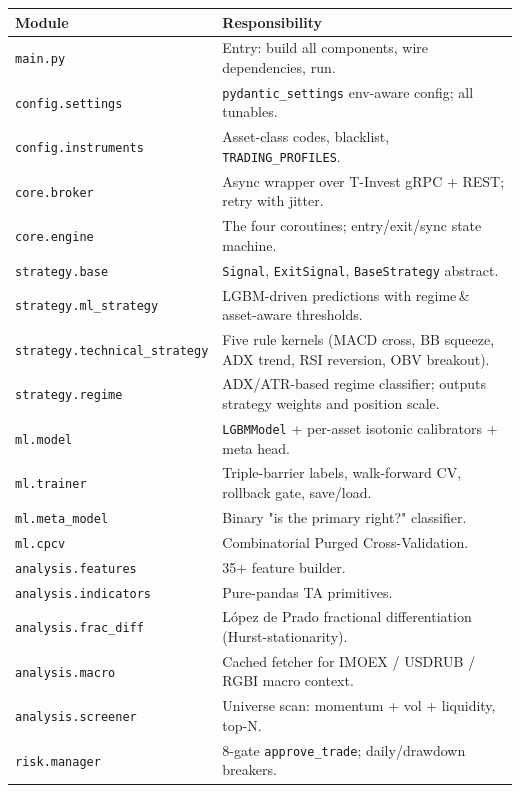 \documentclass[11pt,a4paper]{article}
\begin{document}
\begin{center}
\footnotesize
\begin{tabular}{@{}lp{11cm}@{}}
\toprule
\textbf{Module} & \textbf{Responsibility} \\
\midrule
\texttt{main.py} & Entry: build all components, wire dependencies, run. \\
\texttt{config.settings} & \texttt{pydantic\_settings} env-aware config; all tunables. \\
\texttt{config.instruments} & Asset-class codes, blacklist, \texttt{TRADING\_PROFILES}. \\
\texttt{core.broker} & Async wrapper over T-Invest gRPC + REST; retry with jitter. \\
\texttt{core.engine} & The four coroutines; entry/exit/sync state machine. \\
\texttt{strategy.base} & \texttt{Signal}, \texttt{ExitSignal}, \texttt{BaseStrategy} abstract. \\
\texttt{strategy.ml\_strategy} & LGBM-driven predictions with regime\,\&\,asset-aware thresholds. \\
\texttt{strategy.technical\_strategy} & Five rule kernels (MACD cross, BB squeeze, ADX trend, RSI reversion, OBV breakout). \\
\texttt{strategy.regime} & ADX/ATR-based regime classifier; outputs strategy weights and position scale. \\
\texttt{ml.model} & \texttt{LGBMModel} + per-asset isotonic calibrators + meta head. \\
\texttt{ml.trainer} & Triple-barrier labels, walk-forward CV, rollback gate, save/load. \\
\texttt{ml.meta\_model} & Binary "is the primary right?" classifier. \\
\texttt{ml.cpcv} & Combinatorial Purged Cross-Validation. \\
\texttt{analysis.features} & 35+ feature builder. \\
\texttt{analysis.indicators} & Pure-pandas TA primitives. \\
\texttt{analysis.frac\_diff} & López de Prado fractional differentiation (Hurst-stationarity). \\
\texttt{analysis.macro} & Cached fetcher for IMOEX / USDRUB / RGBI macro context. \\
\texttt{analysis.screener} & Universe scan: momentum + vol + liquidity, top-N. \\
\texttt{risk.manager} & 8-gate \texttt{approve\_trade}; daily/drawdown breakers. \\

\end{tabular}
\end{center}
\end{document}

